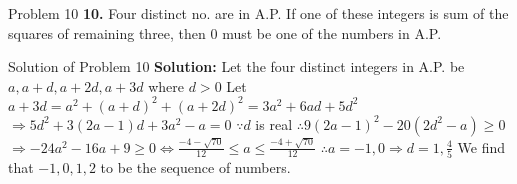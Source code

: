 \documentclass[aspectratio=1610,8pt]{beamer}
\begin{document}
\begin{frame}{Problem 10}
  \textbf{10.} Four distinct no. are in A.P. If one of these integers is sum of the squares of remaining three, then $0$ must be
  one of the numbers in A.P.
\end{frame}
\begin{frame}{Solution of Problem 10}
  \textbf{Solution:} Let the four distinct integers in A.P. be $a, a + d, a + 2d, a + 3d$ where $d > 0$
  \linebreak\linebreak
  Let $a + 3d = a^2 + (a + d)^2 + (a + 2d)^2 = 3a^2 + 6ad + 5d^2$
  \linebreak\linebreak
  $\Rightarrow 5d^2 + 3(2a - 1)d + 3a^2 -a = 0$
  \linebreak\linebreak
  $\because d$ is real $\therefore 9(2a - 1)^2 - 20(2d^2 - a)\geq 0$
  \linebreak\linebreak
  $\Rightarrow -24a^2 - 16a + 9 \geq 0 \Leftrightarrow \frac{-4 - \sqrt{70}}{12}\leq a \leq \frac{-4 + \sqrt{70}}{12}$
  \linebreak\linebreak
  $\therefore a = -1, 0 \Rightarrow d = 1, \frac{4}{5}$
  \linebreak\linebreak
  We find that $-1, 0, 1, 2$ to be the sequence of numbers.
\end{frame}
\end{document}
